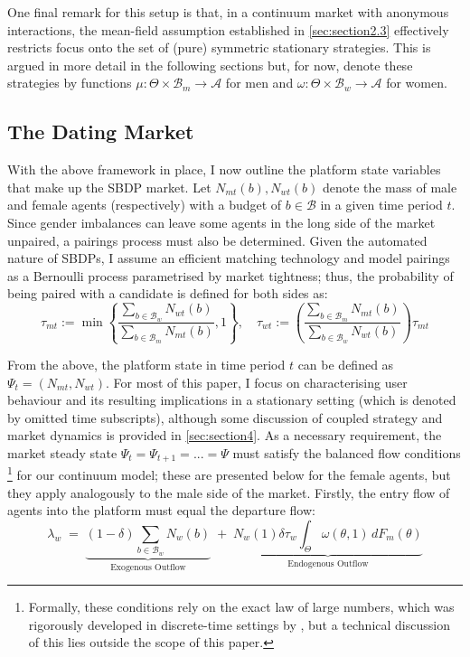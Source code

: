 One final remark for this setup is that, in a continuum market with anonymous interactions, the mean-field assumption established in \autoref{sec:section2.3} effectively restricts focus onto the set of (pure) symmetric stationary strategies. This is argued in more detail in the following sections but, for now, denote these strategies by functions $\mu: \Theta \times\mathcal{B}_m\rightarrow \mathcal{A}$ for men and $\omega:\Theta \times\mathcal{B}_w\rightarrow \mathcal{A}$ for women.

\subsection{The Dating Market}\label{sec:section2.2}
With the above framework in place, I now outline the platform state variables that make up the SBDP market. 
Let $N_{mt}(b), N_{wt}(b)$ denote the mass of male and female agents (respectively) with a budget of $b\in\mathcal{B}$ in a given time period $t$. 
Since gender imbalances can leave some agents in the long side of the market unpaired, a pairings process must also be determined. 
Given the automated nature of SBDPs, I assume an efficient matching technology and model pairings as a Bernoulli process parametrised by market tightness; thus, the probability of being paired with a candidate is defined for both sides as:  
\begin{equation*}
    \tau_{mt}:=\min \left\{\frac{\sum_{b\in\mathcal{B}_w}N_{wt}(b)}{\sum_{b\in\mathcal{B}_m}N_{mt}(b)} , 1 \right\}, 
    \quad \tau_{wt}:= \left(\frac{\sum_{b\in\mathcal{B}_m}N_{mt}(b)}{\sum_{b\in\mathcal{B}_w}N_{wt}(b)} \right) \tau_{mt} 
\end{equation*}

From the above, the platform state in time period $t$ can be defined as $\Psi_t=(N_{mt},N_{wt})$. 
For most of this paper, I focus on characterising user behaviour and its resulting implications in a stationary setting (which is denoted by omitted time subscripts), although some discussion of coupled strategy and market dynamics is provided in \autoref{sec:section4}. 
As a necessary requirement, the market steady state $\Psi_t=\Psi_{t+1}=...=\Psi$ must satisfy the balanced flow conditions \footnote{Formally, these conditions rely on the exact law of large numbers, which was rigorously developed in discrete-time settings by \cite{duffie2018dynamic}, but a technical discussion of this lies outside the scope of this paper.} for our continuum model; these are presented below for the female agents, but they apply analogously to the male side of the market. 
Firstly, the entry flow of agents into the platform must equal the departure flow: 
\begin{equation}\label{eq:ss1} 
    \lambda_w\;=\; \underbrace{ (1-\delta)\sum_{b\in\mathcal{B}_w}N_{w}(b)}_{\text{Exogenous Outflow}} \;+\; \underbrace{N_w(1) \delta \tau_w\int_{\Theta}\omega(\theta,1)\,dF_{m}(\theta)}_{\text{Endogenous Outflow}} 
\end{equation} 

